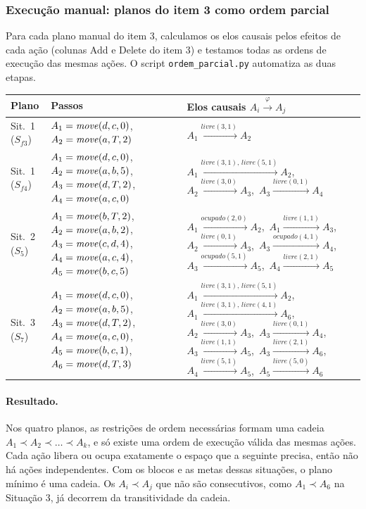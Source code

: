 \subsubsection{Execução manual: planos do item 3 como ordem parcial}

Para cada plano manual do item 3, calculamos os elos causais pelos efeitos de cada ação (colunas Add e Delete do item 3) e testamos todas as ordens de execução das mesmas ações. O script \texttt{ordem\_parcial.py} automatiza as duas etapas.

\begin{center}
\begin{tabular}{l p{3.6cm} p{8.4cm}}
\toprule
Plano & Passos & Elos causais $A_i\xrightarrow{\varphi}A_j$ \\
\midrule
Sit.\ 1 ($S_{f3}$) & $A_1=\mathit{move}(d,c,0)$, $A_2=\mathit{move}(a,T,2)$ & $A_1\xrightarrow{\mathit{livre}(3,1)}A_2$ \\
\midrule
Sit.\ 1 ($S_{f4}$) & $A_1=\mathit{move}(d,c,0)$, $A_2=\mathit{move}(a,b,5)$, $A_3=\mathit{move}(d,T,2)$, $A_4=\mathit{move}(a,c,0)$ &
$A_1\xrightarrow{\mathit{livre}(3,1),\,\mathit{livre}(5,1)}A_2$,\ $A_2\xrightarrow{\mathit{livre}(3,0)}A_3$,\ $A_3\xrightarrow{\mathit{livre}(0,1)}A_4$ \\
\midrule
Sit.\ 2 ($S_5$) & $A_1=\mathit{move}(b,T,2)$, $A_2=\mathit{move}(a,b,2)$, $A_3=\mathit{move}(c,d,4)$, $A_4=\mathit{move}(a,c,4)$, $A_5=\mathit{move}(b,c,5)$ &
$A_1\xrightarrow{\mathit{ocupado}(2,0)}A_2$,\ $A_1\xrightarrow{\mathit{livre}(1,1)}A_3$,\ $A_2\xrightarrow{\mathit{livre}(0,1)}A_3$,\ $A_3\xrightarrow{\mathit{ocupado}(4,1)}A_4$,\ $A_3\xrightarrow{\mathit{ocupado}(5,1)}A_5$,\ $A_4\xrightarrow{\mathit{livre}(2,1)}A_5$ \\
\midrule
Sit.\ 3 ($S_7$) & $A_1=\mathit{move}(d,c,0)$, $A_2=\mathit{move}(a,b,5)$, $A_3=\mathit{move}(d,T,2)$, $A_4=\mathit{move}(a,c,0)$, $A_5=\mathit{move}(b,c,1)$, $A_6=\mathit{move}(d,T,3)$ &
$A_1\xrightarrow{\mathit{livre}(3,1),\,\mathit{livre}(5,1)}A_2$,\ $A_1\xrightarrow{\mathit{livre}(3,1),\,\mathit{livre}(4,1)}A_6$,\ $A_2\xrightarrow{\mathit{livre}(3,0)}A_3$,\ $A_3\xrightarrow{\mathit{livre}(0,1)}A_4$,\ $A_3\xrightarrow{\mathit{livre}(1,1)}A_5$,\ $A_3\xrightarrow{\mathit{livre}(2,1)}A_6$,\ $A_4\xrightarrow{\mathit{livre}(5,1)}A_5$,\ $A_5\xrightarrow{\mathit{livre}(5,0)}A_6$ \\
\bottomrule
\end{tabular}
\end{center}

\paragraph{Resultado.} Nos quatro planos, as restrições de ordem necessárias formam uma cadeia $A_1\prec A_2\prec\dots\prec A_k$, e só existe uma ordem de execução válida das mesmas ações. Cada ação libera ou ocupa exatamente o espaço que a seguinte precisa, então não há ações independentes. Com os blocos e as metas dessas situações, o plano mínimo é uma cadeia. Os $A_i\prec A_j$ que não são consecutivos, como $A_1\prec A_6$ na Situação 3, já decorrem da transitividade da cadeia.

